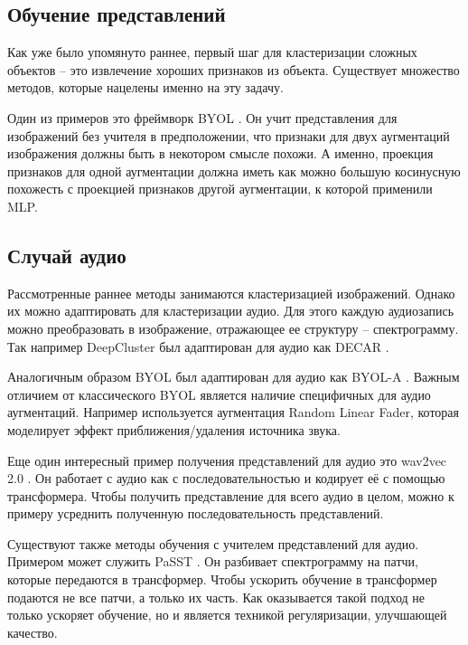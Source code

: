 \documentclass[a4paper,12pt]{extarticle}
\begin{document}
\subsection{Обучение представлений}

Как уже было упомянуто раннее, первый шаг для кластеризации
сложных объектов -- это извлечение хороших признаков из объекта.
Существует множество методов, которые нацелены именно на эту задачу.

Один из примеров это фреймворк BYOL \cite{NEURIPS2020_f3ada80d}.
Он учит представления для изображений без учителя в предположении,
что признаки для двух аугментаций изображения должны быть 
в некотором смысле похожи. А именно, проекция признаков для 
одной аугментации должна иметь как можно большую косинусную 
похожесть с проекцией признаков другой аугментации, к которой 
применили MLP.

\subsection{Случай аудио}

Рассмотренные раннее методы занимаются кластеризацией 
изображений. Однако их можно адаптировать для кластеризации 
аудио. Для этого каждую аудиозапись можно преобразовать в 
изображение, отражающее ее структуру -- спектрограмму.
Так например DeepCluster был адаптирован для аудио как 
DECAR \cite{Ghosh2022DECARDC}.

Аналогичным образом BYOL был адаптирован для аудио как 
BYOL-A \cite{BYOL_A}. Важным отличием от классического
BYOL является наличие специфичных для аудио аугментаций.
Например используется аугментация Random Linear Fader, 
которая моделирует эффект приближения/удаления источника
звука.

Еще один интересный пример получения представлений 
для аудио это wav2vec 2.0 \cite{NEURIPS2020_92d1e1eb}. 
Он работает с аудио как с последовательностью и кодирует 
её с помощью трансформера. Чтобы получить представление 
для всего аудио в целом, можно к примеру усреднить полученную
последовательность представлений. 

Существуют также методы обучения с учителем 
представлений для аудио. Примером может служить 
PaSST \cite{Koutini2021EfficientTO}. Он разбивает 
спектрограмму на патчи, которые передаются в трансформер. 
Чтобы ускорить обучение в трансформер подаются не все 
патчи, а только их часть. Как оказывается такой подход не 
только ускоряет обучение, но и является техникой регуляризации,
улучшающей качество.
\end{document}
